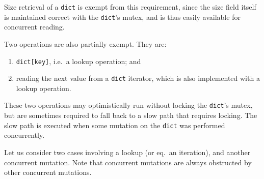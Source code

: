 Size retrieval of a \texttt{dict} is exempt from this requirement, since the size field itself is maintained correct with the \texttt{dict}'s mutex, and is thus easily available for concurrent reading.

Two operations are also partially exempt.
They are:
\begin{enumerate}
	\item \texttt{{dict[key]}}, i.e.\ a lookup operation; and
	\item reading the next value from a \texttt{dict} iterator, which is also implemented with a lookup operation.
\end{enumerate}
These two operations may optimistically run without locking the \texttt{dict}'s mutex, but are sometimes required to fall back to a slow path that requires locking.
The slow path is executed when some mutation on the \texttt{dict} was performed concurrently.

Let us consider two cases involving a lookup (or eq.\ an iteration), and another concurrent mutation.
Note that concurrent mutations are always obstructed by other concurrent mutations.

